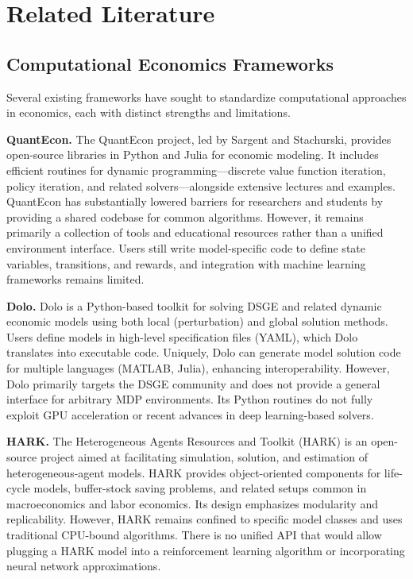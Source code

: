 \documentclass[12pt]{article}
\begin{document}
\section{Related Literature} \label{sec:literature}

\subsection{Computational Economics Frameworks}

Several existing frameworks have sought to standardize computational approaches in economics, each with distinct strengths and limitations.

\textbf{QuantEcon.} The QuantEcon project, led by Sargent and Stachurski, provides open-source libraries in Python and Julia for economic modeling. It includes efficient routines for dynamic programming---discrete value function iteration, policy iteration, and related solvers---alongside extensive lectures and examples. QuantEcon has substantially lowered barriers for researchers and students by providing a shared codebase for common algorithms. However, it remains primarily a collection of tools and educational resources rather than a unified environment interface. Users still write model-specific code to define state variables, transitions, and rewards, and integration with machine learning frameworks remains limited.

\textbf{Dolo.} Dolo is a Python-based toolkit for solving DSGE and related dynamic economic models using both local (perturbation) and global solution methods. Users define models in high-level specification files (YAML), which Dolo translates into executable code. Uniquely, Dolo can generate model solution code for multiple languages (MATLAB, Julia), enhancing interoperability. However, Dolo primarily targets the DSGE community and does not provide a general interface for arbitrary MDP environments. Its Python routines do not fully exploit GPU acceleration or recent advances in deep learning-based solvers.

\textbf{HARK.} The Heterogeneous Agents Resources and Toolkit (HARK) is an open-source project aimed at facilitating simulation, solution, and estimation of heterogeneous-agent models. HARK provides object-oriented components for life-cycle models, buffer-stock saving problems, and related setups common in macroeconomics and labor economics. Its design emphasizes modularity and replicability. However, HARK remains confined to specific model classes and uses traditional CPU-bound algorithms. There is no unified API that would allow plugging a HARK model into a reinforcement learning algorithm or incorporating neural network approximations.
\end{document}
